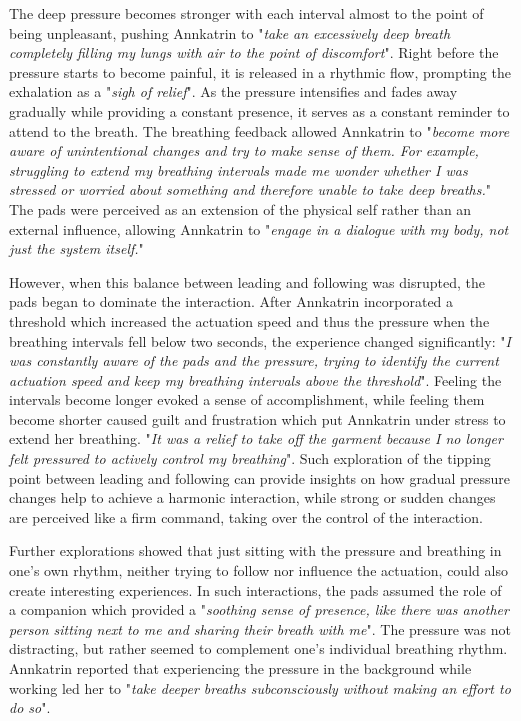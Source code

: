 The deep pressure becomes stronger with each interval almost to the point of being unpleasant, pushing Annkatrin to "\textit{take an excessively deep breath completely filling my lungs with air to the point of discomfort}". Right before the pressure starts to become painful, it is released in a rhythmic flow, prompting the exhalation as a "\textit{sigh of relief}". As the pressure intensifies and fades away gradually while providing a constant presence, it serves as a constant reminder to attend to the breath. The breathing feedback allowed Annkatrin to "\textit{become more aware of unintentional changes and try to make sense of them. For example, struggling to extend my breathing intervals made me wonder whether I was stressed or worried about something and therefore unable to take deep breaths.}" The pads were perceived as an extension of the physical self rather than an external influence, allowing Annkatrin to "\textit{engage in a dialogue with my body, not just the system itself.}"

However, when this balance between leading and following was disrupted, the pads began to dominate the interaction. After Annkatrin incorporated a threshold which increased the actuation speed and thus the pressure when the breathing intervals fell below two seconds, the experience changed significantly: "\textit{I was constantly aware of the pads and the pressure, trying to identify the current actuation speed and keep my breathing intervals above the threshold}". Feeling the intervals become longer evoked a sense of accomplishment, while feeling them become shorter caused guilt and frustration which put Annkatrin under stress to extend her breathing. "\textit{It was a relief to take off the garment because I no longer felt pressured to actively control my breathing}". Such exploration of the tipping point between leading and following can provide insights on how gradual pressure changes help to achieve a harmonic interaction, while strong or sudden changes are perceived like a firm command, taking over the control of the interaction.

Further explorations showed that just sitting with the pressure and breathing in one's own rhythm, neither trying to follow nor influence the actuation, could also create interesting experiences. In such interactions, the pads assumed the role of a companion which provided a "\textit{soothing sense of presence, like there was another person sitting next to me and sharing their breath with me}". The pressure was not distracting, but rather seemed to complement one's individual breathing rhythm. Annkatrin reported that experiencing the pressure in the background while working led her to "\textit{take deeper breaths subconsciously without making an effort to do so}".

